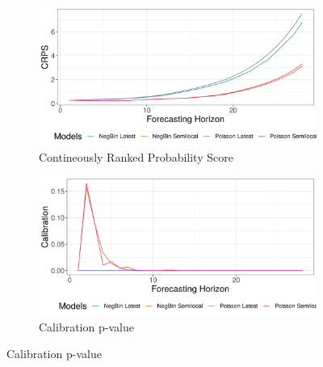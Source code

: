 \begin{figure}[H]
\begin{subfigure}{0.5\textwidth}
  \centering
  \includegraphics[width=\linewidth]{../output/Vuhovi_crps.png}  
  \caption{Contineously Ranked Probability Score}
  \label{fig:sub-first}
\end{subfigure}
\begin{subfigure}{0.5\textwidth}
  \centering
  \includegraphics[width=\linewidth]{../output/Vuhovi_calibration.png}  
  \caption{Calibration p-value}
  \label{fig:sub-second}
\end{subfigure}


\end{figure}
